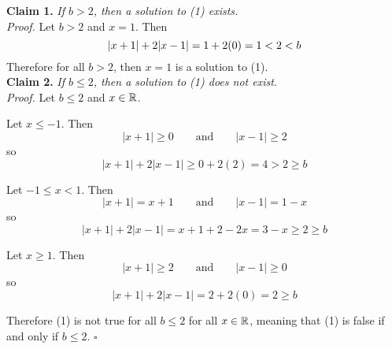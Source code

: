 \documentclass[../MATH137.tex]{subfiles}
\begin{document}
		\textbf{Claim 1.}  \textit{If \(b > 2\), then a solution to (1) exists.} \\
			\textit{Proof.}
				Let \(b > 2\) and \(x = 1\). Then
					\[
						|x + 1| + 2|x - 1| = 1 + 2(0)
							= 1
							< 2 \\
							< b
					\]
				Therefore for all \(b > 2\), then \(x = 1\) is a solution to (1). \\
		\textbf{Claim 2.} \textit{If \(b \le 2\), then a solution to (1) does not exist.} \\
			\textit{Proof.}
				Let \(b \le 2\) and \(x \in \mathbb{R}\). \\
				\begin{description}[leftmargin = \widthof{Case 1: }]
					\item[\normalfont Case 1:] 
						Let \(x \le -1\). Then
							\[
								|x + 1| \ge 0 \qquad \text{and} \qquad
								|x - 1| \ge 2
							\]
						so
							\[
								|x + 1| + 2|x - 1| \ge 0 + 2(2)
									= 4
									> 2
									\ge b
							\]
					\item[\normalfont Case 2:]
						Let \(-1 \le x < 1\). Then
							\[
								|x + 1| = x + 1 \qquad \text{and} \qquad
									|x - 1| = 1 - x 
							\]
						so
							\[
								|x + 1| + 2|x - 1| = x + 1 + 2 - 2x
									= 3 - x
									\ge 2
									\ge b
							\]
					\item[\normalfont Case 3:]
						Let \(x \ge 1\). Then
							\[
								|x + 1| \ge 2 \qquad \text{and} \qquad
									|x - 1| \ge 0
							\]
						so
							\[
								|x + 1| + 2|x - 1| = 2 + 2(0)
									= 2
									\ge b
							\]
				\end{description}
				Therefore (1) is not true for all \(b \le 2\) for all \(x \in \mathbb{R}\), meaning that (1) is false if and only if \(b \le 2\). \(\square\)
\end{document}
